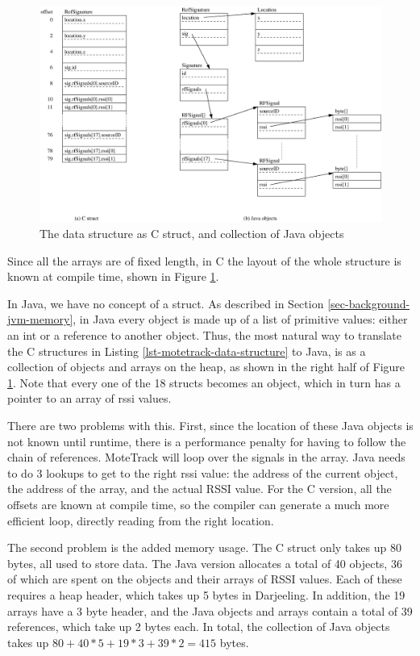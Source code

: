 \begin{figure}
\centering
\includegraphics[width=0.9\linewidth]{motetrack-refsignature-objects}
\caption{The  data structure as C struct, and collection of Java objects}
\label{fig-motetrack-refsignature-objects}
\end{figure}

Since all the arrays are of fixed length, in C the layout of the whole structure is known at compile time, shown in Figure \ref{fig-motetrack-refsignature-objects}.

In Java, we have no concept of a struct. As described in Section \ref{sec-background-jvm-memory}, in Java every object is made up of a list of primitive values: either an int or a reference to another object. Thus, the most natural way to translate the C structures in Listing \ref{lst-motetrack-data-structure} to Java, is as a collection of objects and arrays on the heap, as shown in the right half of Figure \ref{fig-motetrack-refsignature-objects}. Note that every one of the 18  structs becomes an object, which in turn has a pointer to an array of rssi values.

There are two problems with this. First, since the location of these Java objects is not known until runtime, there is a performance penalty for having to follow the chain of references. MoteTrack will loop over the signals in the  array. Java needs to do 3 lookups to get to the right rssi value: the address of the current  object, the address of the  array, and the actual RSSI value. For the C version, all the offsets are known at compile time, so the compiler can generate a much more efficient loop, directly reading from the right location.

The second problem is the added memory usage. The C struct only takes up 80 bytes, all used to store data. The Java version allocates a total of 40 objects, 36 of which are spent on the  objects and their arrays of RSSI values. Each of these requires a heap header, which takes up 5 bytes in Darjeeling. In addition, the 19 arrays have a 3 byte header, and the Java objects and arrays contain a total of 39 references, which take up 2 bytes each. In total, the collection of Java objects takes up $80 + 40*5 + 19*3 + 39*2 = 415$ bytes.

